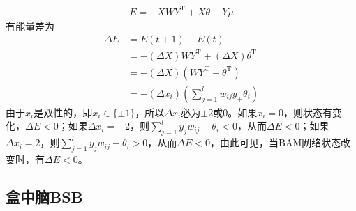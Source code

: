 {\begin{align*}
            E = -XWY^\mathrm{T} + X\theta + Y\mu
            \end{align*}
            有能量差为
            \begin{align*}
            \Delta E & = E(t+1) - E(t)\\
            & = -(\Delta X) WY^\mathrm{T}+(\Delta X)\theta^\mathrm{T}\\
            & =-(\Delta X) (WY^\mathrm{T} - \theta^\mathrm{T}) \\
            & = -(\Delta x_i) \left( \sum_{j=1}^l w_{ij}y_+\theta_i \right)
            \end{align*}
            由于$x_i$是双性的，即$x_i\in \{\pm 1\}$，所以$\Delta x_i$必为$\pm 2$或$0$。如果$x_i=0$，则状态有变化，$\Delta E <0$；如果$\Delta x_i = -2$，则$\sum\limits_{j=1}^l y_jw_{ij}-\theta_i <0$，从而$\Delta E < 0$；如果$\Delta x_i=2$，则$\sum\limits_{j=1}^ly_jw_{ij}-\theta_i > 0$，从而$\Delta E < 0$，由此可见，当BAM网络状态改变时，有$\Delta E <0$。

    \subsection{盒中脑BSB}
}
